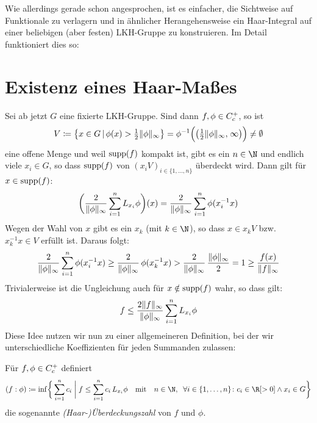 Wie allerdings gerade schon angesprochen, ist es einfacher, die Sichtweise auf
Funktionale zu verlagern und in ähnlicher Herangehensweise ein Haar-Integral auf
einer beliebigen (aber festen) LKH-Gruppe zu konstruieren. Im Detail
funktioniert dies so:


\section{Existenz eines Haar-Maßes}
Sei ab jetzt $G$ eine fixierte LKH-Gruppe. Sind dann $f,\phi\in C_c^+$,
so ist 
\[ V \defeq \bigl\{ x \in G \Mid \phi(x) > \thalf\supnorm\phi \bigr\} 
      = \phi^{-1}\Bigl( \bigl( \thalf\supnorm\phi, \mkern2mu\infty\bigr) \Bigr)
      \neq \emptyset
\]
eine offene Menge und weil $\operatorname{supp}(f)$ kompakt ist, gibt es ein $n\in\N$ und 
endlich viele $x_i\in G$, so dass $\operatorname{supp}(f)$ von $(x_iV)_{i\in\{1,\ldots,n\}}$ 
überdeckt wird. Dann gilt für $x\in\operatorname{supp}(f)$:
\[
    \biggl( \frac{2}{\lVert\phi\rVert_\infty} \sum_{i=1}^n L_{x_i}\phi \biggr)(x)
    = \frac{2}{\lVert\phi\rVert_\infty} \sum_{i=1}^n \phi(x_i^{-1}x)
\]
Wegen der Wahl von $x$ gibt es ein $x_k$ (mit $k\in\N$), so
dass $x\in x_kV$ bzw. $x_k^{-1}x\in V$ erfüllt ist. Daraus folgt:
\[  
    \frac{2}{\lVert\phi\rVert_\infty} \sum_{i=1}^n \phi(x_i^{-1}x)
    \geq \frac{2}{\lVert\phi\rVert_\infty} \, \phi(x_k^{-1}x)
    > \frac{2}{\lVert\phi\rVert_\infty} \, \frac{\lVert\phi\rVert_\infty}{2} 
    = 1 \geq \frac{f(x)}{\lVert f\rVert_\infty}
\]
Trivialerweise ist die Ungleichung auch für $x\notin\operatorname{supp}(f)$ wahr, so dass
gilt:
\[  f \leq \frac{2\lVert f\rVert_\infty}{\lVert\phi\rVert_\infty} \sum_{i=1}^n L_{x_i}\phi  \]
Diese Idee nutzen wir nun zu einer allgemeineren Definition, bei der wir
unterschiedliche Koeffizienten für jeden Summanden zulassen:

\begin{thDef}
    \label{pf:def:covernum}
    Für $f,\phi \in C_c^+$ definiert
    \[
        (f : \phi) \defeq 
        \inf \biggl\{\, \sum_{i=1}^n c_i  \cMid[\;]{\bigg} 
                     f \leq \sum_{i=1}^n c_i \, L_{x_i}\phi 
                     \qtextq{mit} n\in\N, \;\;
                     \forall i\in\{1,\ldots,n\}\colon 
                     c_i\in\R[>0] \wedge x_i\in G
            \biggr\}
    \]
    die sogenannte \emph{(Haar-)Überdeckungszahl} von $f$ und $\phi$.
\end{thDef}


